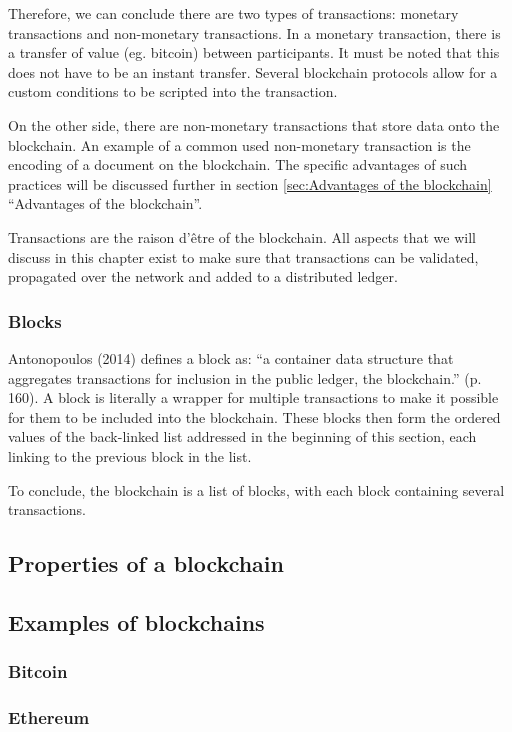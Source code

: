 Therefore, we can conclude there are two types of transactions: monetary transactions and non-monetary transactions. In a monetary transaction, there is a transfer of value (eg. bitcoin) between participants. It must be noted that this does not have to be an instant transfer. Several blockchain protocols allow for a custom conditions to be scripted into the transaction.

On the other side, there are non-monetary transactions that store data onto the blockchain. An example of a common used non-monetary transaction is the encoding of a document on the blockchain. The specific advantages of such practices will be discussed further in section \ref{sec:Advantages of the blockchain} ``Advantages of the blockchain''.

Transactions are the raison d'\^{e}tre of the blockchain. All aspects that we will discuss in this chapter exist to make sure that transactions can be validated, propagated over the network and added to a distributed ledger.

\subsubsection{Blocks}
\label{subsec:Blocks}

Antonopoulos (2014) \cite{antonopoulos:2014} defines a block as: ``a container data structure that aggregates transactions for inclusion in the public ledger, the blockchain.'' (p. 160). A block is literally a wrapper for multiple transactions to make it possible for them to be included into the blockchain. These blocks then form the ordered values of the back-linked list addressed in the beginning of this section, each linking to the previous block in the list.

To conclude, the blockchain is a list of blocks, with each block containing several transactions.

\subsection{Properties of a blockchain}

\subsection{Examples of blockchains}

\subsubsection{Bitcoin}
\subsubsection{Ethereum}